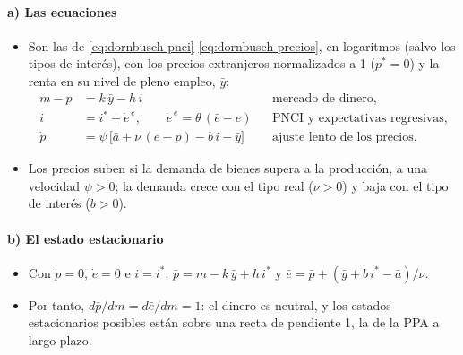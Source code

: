 \documentclass[11pt]{article}
\begin{document}
\paragraph{a) Las ecuaciones}
\begin{itemize}
\item Son las de \eqref{eq:dornbusch-pnci}-\eqref{eq:dornbusch-precios}, en logaritmos (salvo los tipos de interés), con los precios extranjeros normalizados a 1 ($p^*=0$) y la renta en su nivel de pleno empleo, $\bar y$:
  \begin{align*}
  m-p&=k\,\bar y-h\,i &&\text{mercado de dinero,}\\
  i&=i^{*}+\dot e^{\,e},\qquad \dot e^{\,e}=\theta\,(\bar e-e) &&\text{PNCI y expectativas regresivas,}\\
  \dot p&=\psi\,\big[\bar a+\nu\,(e-p)-b\,i-\bar y\big] &&\text{ajuste lento de los precios.}
  \end{align*}
\item Los precios suben si la demanda de bienes supera a la producción, a una velocidad $\psi>0$; la demanda crece con el tipo real ($\nu>0$) y baja con el tipo de interés ($b>0$).
\end{itemize}

\paragraph{b) El estado estacionario}
\begin{itemize}
\item Con $\dot p=0$, $\dot e=0$ e $i=i^*$: $\bar p=m-k\,\bar y+h\,i^*$ y $\bar e=\bar p+(\bar y+b\,i^*-\bar a)/\nu$.
\item Por tanto, $d\bar p/dm=d\bar e/dm=1$: el dinero es neutral, y los estados estacionarios posibles están sobre una recta de pendiente 1, la de la PPA a largo plazo.
\end{itemize}
\end{document}
